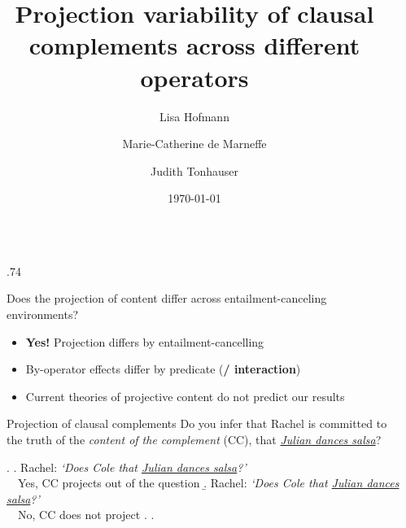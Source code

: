 \documentclass[final, table, cmyk]{beamer}
\title{Projection variability of clausal complements across different operators}
\author{Lisa Hofmann\inst{1} \and Marie-Catherine de Marneffe\inst{2} \and Judith Tonhauser\inst{1}}
\institute[shortinst]{\inst{1} University of Stuttgart \samelineand \inst{2} UCLouvain}
\date{\today}
\newlength{\sepwidth}
\newlength{\colwidth}
\newlength{\vboxsep}
\newcommand{\separatorcolumn}{\begin{column}{\sepwidth}\end{column}}
\begin{document}
	
\begin{frame}[t]

	\vspace{-2cm}
	\begin{columns}[t]
		\separatorcolumn
		
		\begin{column}{.74\colwidth}
			\begin{upshotbox}{Does the projection of content differ across entailment-canceling environments?}

				\begin{itemize}
					\item[\color{highlight}{$\blacktriangleright$}] \textbf{Yes!} Projection differs by entailment-cancelling \ophighlight{operator}
						
					\item[\color{highlight}{$\blacktriangleright$}] By-operator effects differ by predicate (\textbf{/ interaction})
					
					\item[\color{highlight}{$\blacktriangleright$}] Current theories of projective content do not predict our results
				\end{itemize}
				
			\end{upshotbox}
			\vspace{\vboxsep}
			\begin{normalbox}{Projection of clausal complements}
				Do you infer that Rachel is committed to the truth of the \textit{content of the complement} (CC), that \underline{\em Julian dances salsa}?
				
				\vspace{-.3\baselineskip}
				\ex. \a. Rachel: \emph{\lq Does Cole  that \underline{Julian dances salsa}?\rq}\\
					\cmark\ \  Yes, CC projects out of the question
					\b. Rachel: \emph{\lq Does Cole  that \underline{Julian dances salsa}?\rq}\\
					\xmark\ \ No, CC does not project
					\z.
				\z.
				
				\vspace{-.7\baselineskip}
\end{normalbox}
\end{column}
\end{columns}
\end{frame}
\end{document}
